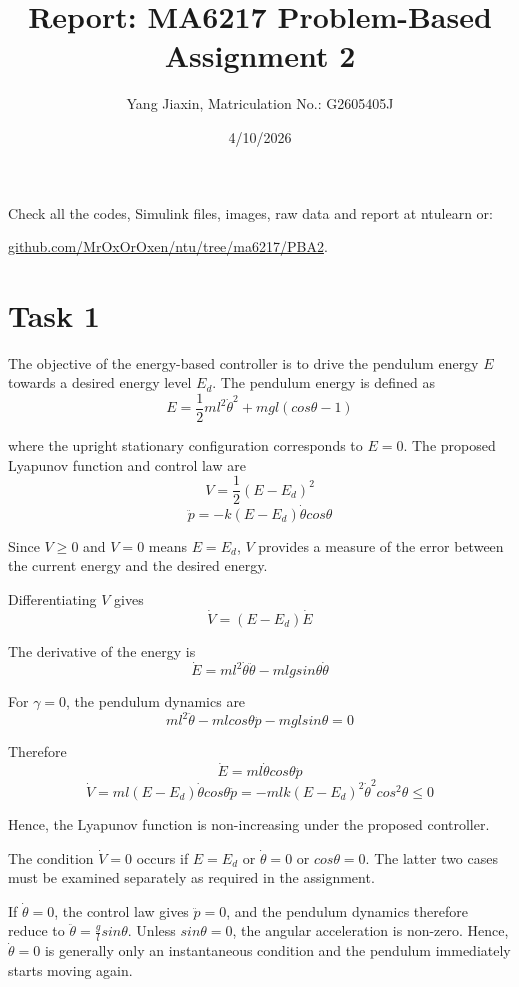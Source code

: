 \documentclass[12pt]{article}
\title{Report: MA6217 Problem-Based Assignment 2}
\author{Yang Jiaxin, Matriculation No.: G2605405J}
\date{4/10/2026}
\begin{document}
\maketitle

Check all the codes, Simulink files, images, raw data and report at ntulearn or:

\href{https://github.com/MrOxOrOxen/ntu/tree/ma6217/PBA2}{github.com/MrOxOrOxen/ntu/tree/ma6217/PBA2}.

\section{Task 1}

The objective of the energy-based controller is to drive the pendulum energy $E$ towards a desired energy level $E_d$. The pendulum energy is defined as
$$E = \frac{1}{2}ml^2\dot{\theta}^2 + mgl(cos\theta-1)$$

where the upright stationary configuration corresponds to $E=0$. The proposed Lyapunov function and control law are
$$V = \frac{1}{2}(E-E_d)^2$$
$$\ddot{p}=-k(E-E_d)\dot{\theta}cos\theta$$

Since $V \ge 0$ and $V=0$ means $E=E_d$, $V$ provides a measure of the error between the current energy and the desired energy.

Differentiating $V$ gives
$$\dot{V} = (E-E_d)\dot{E}$$

The derivative of the energy is
$$\dot{E} = ml^2\dot{\theta}\ddot{\theta} - mlgsin\theta\dot{\theta}$$

For $\gamma=0$, the pendulum dynamics are
$$ml^2\ddot{\theta}-mlcos\theta\ddot{p}-mglsin\theta=0$$

Therefore
$$\dot{E} = ml\dot{\theta}cos\theta\ddot{p}$$
$$\dot{V} = ml(E-E_d)\dot{\theta}cos\theta\ddot{p} = -mlk(E-E_d)^2\dot{\theta}^2cos^2\theta \le 0$$

Hence, the Lyapunov function is non-increasing under the proposed controller.

The condition $\dot{V} = 0$ occurs if $E=E_d$ or $\dot{\theta}=0$ or $cos\theta=0$. The latter two cases must be examined separately as required in the assignment.

If $\dot{\theta}=0$, the control law gives $\ddot{p}=0$, and the pendulum dynamics therefore reduce to $\ddot{\theta}=\frac{g}{l}sin\theta$. Unless $sin\theta=0$, the angular acceleration is non-zero. Hence, $\dot{\theta}=0$ is generally only an instantaneous condition and the pendulum immediately starts moving again.
\end{document}
